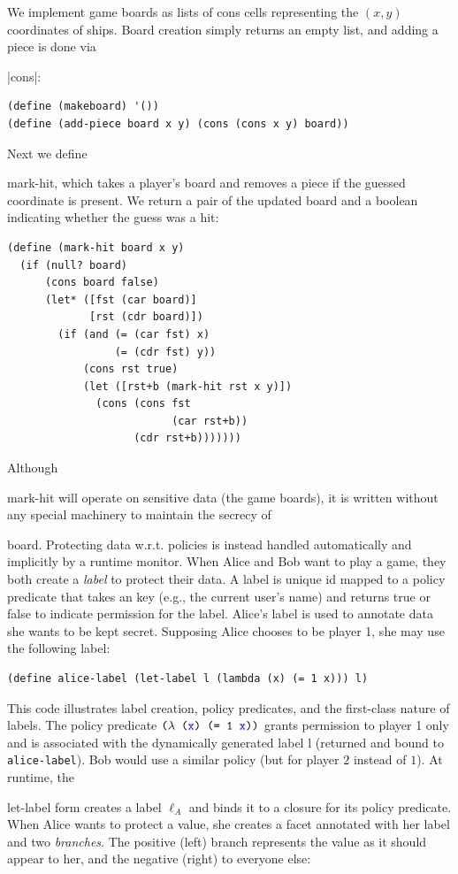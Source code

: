 \documentclass[review=true,acmlarge]{acmart}
\newcommand*{\SavedLstInline}{}
\DeclareRobustCommand*{\lstinline}{%
  \ifmmode
    \let\SavedBGroup\bgroup
    \def\bgroup{%
      \let\bgroup\SavedBGroup
      \hbox\bgroup
    }%
  \fi
  \SavedLstInline
}
\newcommand{\colorMATH}{black!20!blue}
\newcommand{\blue}[1] {{\color{\colorMATH} #1}}
\newcommand{\code}[1]{\lstinline{#1}}
\begin{document}
We implement game boards as lists of cons cells representing the
\blue{$(x,y)$} coordinates of ships. Board creation simply returns an empty
list, and adding a piece is done via \lstinline|cons|:

\begin{lstlisting}[language=Racket,escapechar=|,name=example]
(define (makeboard) '())
(define (add-piece board x y) (cons (cons x y) board))
\end{lstlisting}

Next we define \code{mark-hit}, which takes a player's board and
removes a piece if the guessed coordinate is present. We 
return a pair of the updated board and a boolean indicating
whether the guess was a hit:

\begin{lstlisting}[language=Racket,escapechar=|,name=example]
(define (mark-hit board x y)
  (if (null? board)
      (cons board false)
      (let* ([fst (car board)]
             [rst (cdr board)])
        (if (and (= (car fst) x)
                 (= (cdr fst) y))
            (cons rst true)
            (let ([rst+b (mark-hit rst x y)])
              (cons (cons fst
                          (car rst+b))
                    (cdr rst+b)))))))
\end{lstlisting}

Although \code{mark-hit} will operate on sensitive data (the game
boards), it is written without any special machinery to maintain the
secrecy of \code{board}. Protecting data {w.r.t.} policies is instead handled
automatically and implicitly by a runtime monitor.
When Alice and Bob want to play a game, they both create a
\emph{label} to protect their data. A label is unique id mapped to a policy predicate
that takes an key (e.g., the current user's name) and returns true or false to indicate
permission for the label. Alice's label is used to annotate data she wants
to be kept secret. Supposing Alice chooses to be player 1, she may use the
following label:

\begin{lstlisting}[language=Racket,escapechar=|,name=example]
(define alice-label (let-label l (lambda (x) (= 1 x))) l)
\end{lstlisting}

This code illustrates label creation, policy predicates, and the first-class
nature of labels. The policy predicate $\texttt{($\lambda$ (\blue{x}) (= 1 \blue{x}))}$
grants permission to player 1 only and is associated with the dynamically generated
label l (returned and bound to \texttt{\blue{alice-label}}).
Bob would use a similar policy (but for player $2$ instead of $1$). At runtime,
the \code{let-label} form creates a label \blue{$\ell_{A}$} and binds
it to a closure for its policy predicate. When Alice wants to protect a
value, she creates a facet annotated with her label and two
\emph{branches}. The positive (left) branch represents the value as it
should appear to her, and the negative (right) to everyone else:
\end{document}
